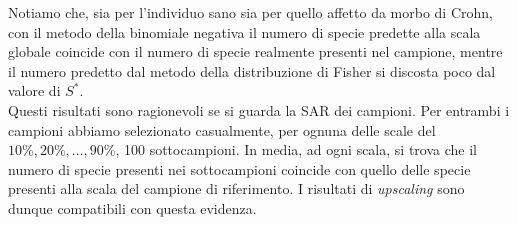 Notiamo che, sia per l'individuo sano sia per quello affetto da morbo di Crohn, con il metodo della binomiale negativa il numero di specie predette alla scala globale coincide con il numero di specie realmente presenti nel campione, mentre il numero predetto dal metodo della distribuzione di Fisher si discosta poco dal valore di $S^*$.\\
Questi risultati sono ragionevoli se si guarda la SAR dei campioni. Per entrambi i campioni abbiamo selezionato casualmente, per ognuna delle scale del $10\%,20\%,...,90\%$, 100 sottocampioni. In media, ad ogni scala, si trova che il numero di specie presenti nei sottocampioni coincide con quello delle specie presenti alla scala del campione di riferimento. I risultati di \emph{upscaling} sono dunque compatibili con questa evidenza. 